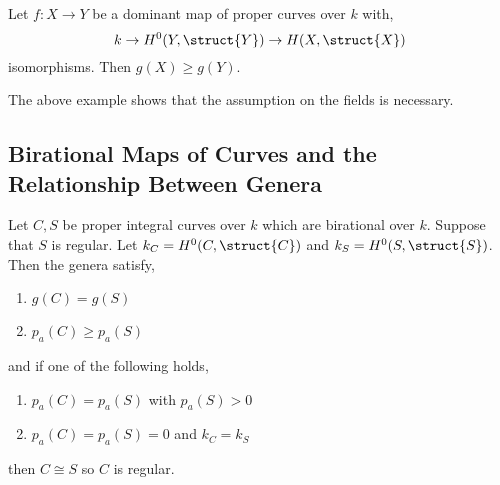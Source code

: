\documentclass[12pt]{article}
\begin{document}
\begin{cor}
Let $f : X \to Y$ be a dominant map of proper curves over $k$ with,
\[ k \to H^0(Y, \struct{Y}) \to H(X, \struct{X}) \] 
isomorphisms. Then $g(X) \ge g(Y)$.
\end{cor}

\begin{rmk}
The above example shows that the assumption on the fields is necessary. 
\end{rmk}

\subsection{Birational Maps of Curves and the Relationship Between Genera}

\begin{lemma} \label{genus_formulas}
Let $C, S$ be proper integral curves over $k$ which are birational over $k$. Suppose that $S$ is regular. Let $k_C = H^0(C, \struct{C})$ and $k_S = H^0(S, \struct{S})$. Then the genera satisfy,
\begin{enumerate}
\item $g(C) = g(S)$
\item $p_a(C) \ge p_a(S)$
\end{enumerate}
and if one of the following holds,
\begin{enumerate}
\item $p_a(C) = p_a(S)$ with $p_a(S) > 0$
\item $p_a(C) = p_a(S) = 0$ and $k_C = k_{S}$
\end{enumerate}
then $C \cong S$ so $C$ is regular.
\end{lemma}
\end{document}
